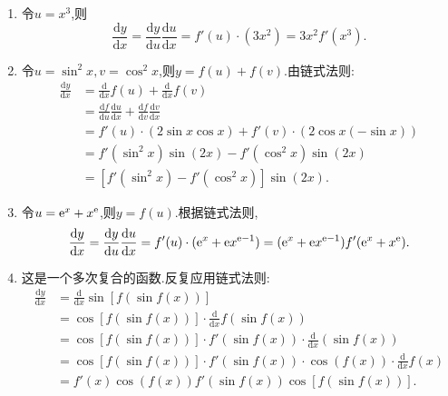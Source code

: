 \begin{solution}
    \begin{enumerate}
        \item 令$u=x^3$,则
              $$ \frac{\mathrm{d}y}{\mathrm{d}x} = \frac{\mathrm{d}y}{\mathrm{d}u} \frac{\mathrm{d}u}{\mathrm{d}x} = f'(u) \cdot (3x^2) = 3x^2f'(x^3). $$

        \item 令$u=\sin^2 x, v = \cos^2 x$,则$y=f(u)+f(v)$.由链式法则:
              \begin{align*}
                  \frac{\mathrm{d}y}{\mathrm{d}x} & = \frac{\mathrm{d}}{\mathrm{d}x}f(u) + \frac{\mathrm{d}}{\mathrm{d}x}f(v)                                                         \\
                                                  & = \frac{\mathrm{d}f}{\mathrm{d}u}\frac{\mathrm{d}u}{\mathrm{d}x} + \frac{\mathrm{d}f}{\mathrm{d}v}\frac{\mathrm{d}v}{\mathrm{d}x} \\
                                                  & = f'(u) \cdot (2\sin x \cos x) + f'(v) \cdot (2\cos x (-\sin x))                                                                  \\
                                                  & = f'(\sin^2 x) \sin(2x) - f'(\cos^2 x) \sin(2x)                                                                                   \\
                                                  & = [f'(\sin^2 x) - f'(\cos^2 x)] \sin(2x).
              \end{align*}

        \item 令$u = \mathrm{e}^x+x^{\mathrm{e}}$,则$y=f(u)$.根据链式法则,
              $$ \frac{\mathrm{d}y}{\mathrm{d}x} = \frac{\mathrm{d}y}{\mathrm{d}u} \frac{\mathrm{d}u}{\mathrm{d}x} = f'(u) \cdot (\mathrm{e}^x + \mathrm{e} x^{\mathrm{e}-1}) = (\mathrm{e}^x + \mathrm{e} x^{\mathrm{e}-1}) f'(\mathrm{e}^x+x^{\mathrm{e}}). $$

        \item 这是一个多次复合的函数.反复应用链式法则:
              \begin{align*}
                  \frac{\mathrm{d}y}{\mathrm{d}x} & = \frac{\mathrm{d}}{\mathrm{d}x} \sin[f(\sin f(x))]                                                 \\
                                                  & = \cos[f(\sin f(x))] \cdot \frac{\mathrm{d}}{\mathrm{d}x} f(\sin f(x))                              \\
                                                  & = \cos[f(\sin f(x))] \cdot f'(\sin f(x)) \cdot \frac{\mathrm{d}}{\mathrm{d}x} (\sin f(x))           \\
                                                  & = \cos[f(\sin f(x))] \cdot f'(\sin f(x)) \cdot \cos(f(x)) \cdot \frac{\mathrm{d}}{\mathrm{d}x} f(x) \\
                                                  & = f'(x) \cos(f(x)) f'(\sin f(x)) \cos[f(\sin f(x))].
              \end{align*}


\end{enumerate}
\end{solution}
